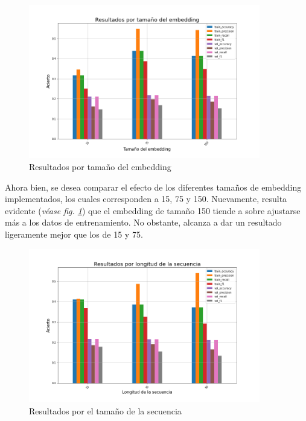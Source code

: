 \begin{figure}[H]
    \centering
    \includegraphics[width=0.9\textwidth]{results/friends/deepModels/sim_res_deep_em_size.png}
    \caption{Resultados por tamaño del embedding}
    \label{fig:sim_deep_em_size}
\end{figure}

Ahora bien, se desea comparar el efecto de los diferentes tamaños de embedding implementados, los cuales corresponden a 15, 75 y 150. Nuevamente, resulta evidente (\textit{véase fig. \ref{fig:sim_deep_em_size}}) que el embedding de tamaño 150 tiende a sobre ajustarse más a los datos de entrenamiento. No obstante, alcanza a dar un resultado ligeramente mejor que los de 15 y 75.\\

\begin{figure}[H]
    \centering
    \includegraphics[width=0.9\textwidth]{results/friends/deepModels/sim_res_deep_seq_len.png}
    \caption{Resultados por el tamaño de la secuencia}
    \label{fig:sim_deep_seq_len}
\end{figure}

